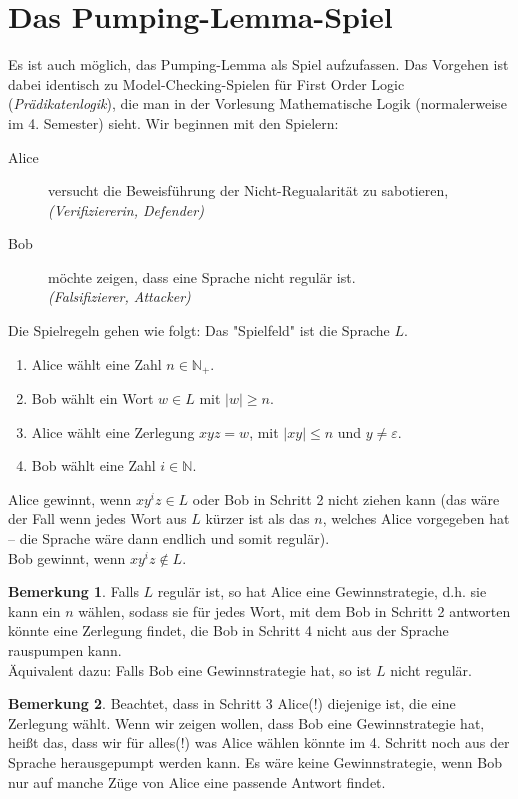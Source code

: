 \documentclass[11pt, a4paper]{article}
\theoremstyle{definition}
\newtheorem*{remark*}{Bemerkung}
\theoremstyle{plain}
\begin{document}
\section*{Das Pumping-Lemma-Spiel}
Es ist auch möglich, das Pumping-Lemma als Spiel aufzufassen. Das Vorgehen ist dabei identisch zu Model-Checking-Spielen für First Order Logic (\textit{Prädikatenlogik}), die man in der Vorlesung Mathematische Logik (normalerweise im 4. Semester) sieht. Wir beginnen mit den Spielern:
\begin{description}
	\item[Alice] versucht die Beweisführung der Nicht-Regualarität zu sabotieren,\\
		\textit{(Verifiziererin, Defender)}
	\item[Bob] möchte zeigen, dass eine Sprache nicht regulär ist.\\
		\textit{(Falsifizierer, Attacker)}
\end{description}
Die Spielregeln gehen wie folgt: Das "Spielfeld" ist die Sprache $L$.
\begin{enumerate}[label=\arabic*)]
	\item Alice wählt eine Zahl $n \in \mathbb{N}_+$.
	\item Bob wählt ein Wort $w \in L$ mit $\left| w \right| \geq n$.
	\item Alice wählt eine Zerlegung $xyz = w$, mit $\left| xy \right| \leq n$ und $y \neq \varepsilon$.
	\item Bob wählt eine Zahl $i \in \mathbb{N}$.
\end{enumerate}
Alice gewinnt, wenn $xy^iz \in L$ oder Bob in Schritt 2 nicht ziehen kann (das wäre der Fall wenn jedes Wort aus $L$ kürzer ist als das $n$, welches Alice vorgegeben hat -- die Sprache wäre dann endlich und somit regulär).\\
Bob gewinnt, wenn $xy^iz \notin L$.

\begin{remark*}
	Falls $L$ regulär ist, so hat Alice eine Gewinnstrategie, d.h. sie kann ein $n$ wählen, sodass sie für jedes Wort, mit dem Bob in Schritt 2 antworten könnte eine Zerlegung findet, die Bob in Schritt 4 nicht aus der Sprache rauspumpen kann.\\
	Äquivalent dazu: Falls Bob eine Gewinnstrategie hat, so ist $L$ nicht regulär.
\end{remark*}
\begin{remark*}
	Beachtet, dass in Schritt 3 Alice(!) diejenige ist, die eine Zerlegung wählt. Wenn wir zeigen wollen, dass Bob eine Gewinnstrategie hat, heißt das, dass wir für alles(!) was Alice wählen könnte im 4. Schritt noch aus der Sprache herausgepumpt werden kann. Es wäre keine Gewinnstrategie, wenn Bob nur auf manche Züge von Alice eine passende Antwort findet.
\end{remark*}
\end{document}
